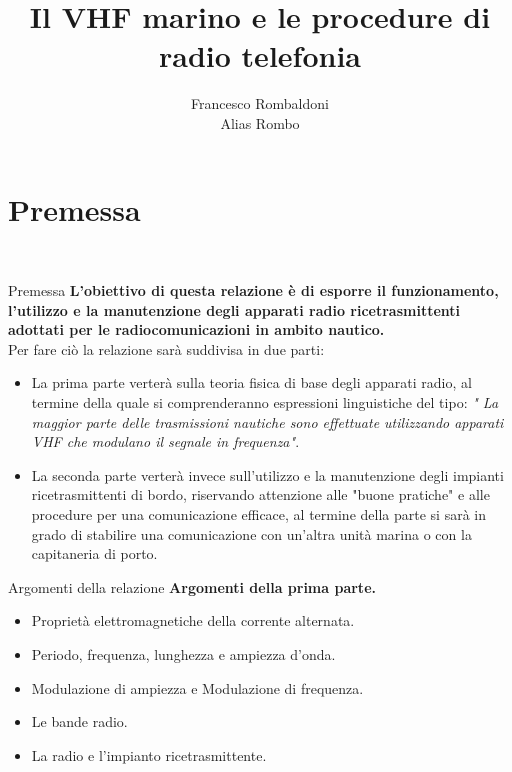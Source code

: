 \documentclass[aspectratio=169]{beamer}
\title{Il VHF marino e le procedure di radio telefonia}
\author{Francesco Rombaldoni\\
Alias Rombo}
\date{}
\institute{Università degli Studi di Urbino "Carlo Bo"}
\begin{document}
	
	\begin{frame} 
		\maketitle 		
	\end{frame}
	
	\section{Premessa}
	\begin{frame}
		\centering{{\textcolor{blue!80}{\huge{\textbf{Premessa}}}}}\\
	\end{frame}

	\begin{frame}{Premessa}
		\textbf{L'obiettivo di questa relazione è di esporre il funzionamento, l'utilizzo e la manutenzione degli apparati radio ricetrasmittenti adottati per le radiocomunicazioni in ambito nautico.}\\
		\bigskip
		Per fare ciò la relazione sarà suddivisa in due parti:\\
		\begin{itemize}
			\item La prima parte verterà sulla teoria fisica di base degli apparati radio, al termine della quale si comprenderanno espressioni linguistiche del tipo: \emph{" La maggior parte delle trasmissioni nautiche sono effettuate utilizzando apparati VHF che modulano il segnale in frequenza"}.\\
			\item La seconda parte verterà invece sull'utilizzo e la manutenzione degli impianti ricetrasmittenti di bordo, riservando attenzione alle "buone pratiche" e alle procedure per una comunicazione efficace, al termine della parte si sarà in grado di stabilire una comunicazione con un'altra unità marina o con la capitaneria di porto.
		\end{itemize}
	\end{frame}

	\begin{frame}{Argomenti della relazione}
		\textbf{Argomenti della prima parte.}
		\begin{itemize}
			\item Proprietà elettromagnetiche della corrente alternata.
			\item Periodo, frequenza, lunghezza e ampiezza d'onda.
			\item Modulazione di ampiezza e Modulazione di frequenza.
			\item Le bande radio.
			\item La radio e l'impianto ricetrasmittente.
		\end{itemize}
	\end{frame}
\end{document}
